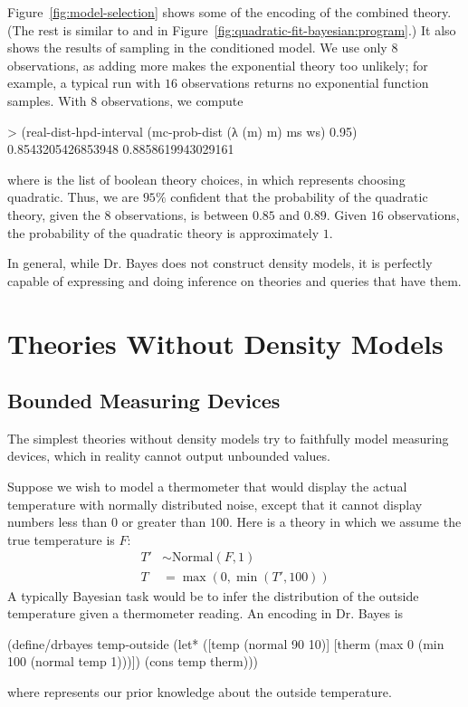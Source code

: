 Figure~\ref{fig:model-selection} shows some of the encoding of the combined theory.
(The rest is similar to  and  in Figure~\ref{fig:quadratic-fit-bayesian:program}.)
It also shows the results of sampling in the conditioned model.
We use only $8$ observations, as adding more makes the exponential theory too unlikely; for example, a typical run with $16$ observations returns no exponential function samples.
With $8$ observations, we compute
\begin{center}\singlespacing
\begin{schemedisplay}
> (real-dist-hpd-interval
   (mc-prob-dist (λ (m) m) ms ws)
   0.95)
0.8543205426853948
0.8858619943029161
\end{schemedisplay}
\end{center}
where  is the list of boolean theory choices, in which  represents choosing quadratic.
Thus, we are $95\%$ confident that the probability of the quadratic theory, given the $8$ observations, is between $0.85$ and $0.89$.
Given $16$ observations, the probability of the quadratic theory is approximately $1$.

In general, while Dr. Bayes does not construct density models, it is perfectly capable of expressing and doing inference on theories and queries that have them.

\section{Theories Without Density Models}

\subsection{Bounded Measuring Devices}

The simplest theories without density models try to faithfully model measuring devices, which in reality cannot output unbounded values.

Suppose we wish to model a thermometer that would display the actual temperature with normally distributed noise, except that it cannot display numbers less than $0$ or greater than $100$.
Here is a theory in which we assume the true temperature is $\mathit{F}$:
%
\begin{equation}
\begin{aligned}
	T' &\sim \mathrm{Normal}(F,1) \\
	T &= \max(0,\min(T',100))
\end{aligned}
\end{equation}
%
A typically Bayesian task would be to infer the distribution of the outside temperature given a thermometer reading.
An encoding in Dr. Bayes is
\begin{center}\singlespacing
\begin{schemedisplay}
(define/drbayes temp-outside
  (let* ([temp   (normal 90 10)]
         [therm  (max 0 (min 100 (normal temp 1)))])
    (cons temp therm)))
\end{schemedisplay}
\end{center}
where  represents our prior knowledge about the outside temperature.

